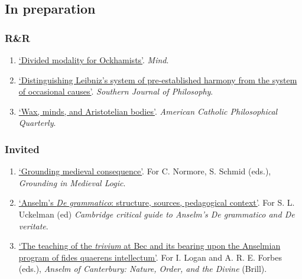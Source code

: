 \subsection{In preparation}
\subsubsection{R\&R}
\begin{enumerate}
	\setcounter{enumi}{\value{publicationCounter}}	%
	\item \datedsubsectionnarrow{}
	{}
	{
		\href{}{`Divided modality for Ockhamists'}. \emph{Mind}.}
	{}
	\item \datedsubsectionnarrow{}
{}
{
	\href{}{`Distinguishing Leibniz's system of pre-established harmony from the system of occasional causes'}. \emph{Southern Journal of Philosophy}.}
{}
	\item \datedsubsectionnarrow{}
{}
{
	\href{}{`Wax, minds, and Aristotelian bodies'}. \emph{American Catholic Philosophical Quarterly}.}
{}
	\setcounter{publicationCounter}{\value{enumi}}	%
\end{enumerate}
\subsubsection{Invited}
\begin{enumerate}
	\setcounter{enumi}{\value{publicationCounter}}	%
	\item \datedsubsectionnarrow{}
	{}
	{
		\href{}{`Grounding medieval consequence'}. For C. Normore, S. Schmid (eds.), \emph{Grounding in Medieval Logic}.}
	{}
	\item \datedsubsectionnarrow{}
	{}
	{
		\href{}{`Anselm's \emph{De grammatico}: structure, sources, pedagogical context'}. For S. L. Uckelman (ed) \emph{Cambridge critical guide to Anselm's De grammatico and De veritate}.}
	{}
	\item \datedsubsectionnarrow{}
	{}
	{
		\href{}{`The teaching of the \emph{trivium} at Bec and its bearing upon the Anselmian program of {fides quaerens intellectum}'}. For I. Logan and A. R. E. Forbes (eds.), \emph{Anselm of Canterbury: Nature, Order, and the Divine} (Brill).}
	{}
	\setcounter{publicationCounter}{\value{enumi}}	%
\end{enumerate}
